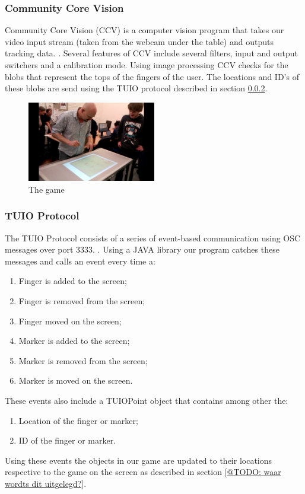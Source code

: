 \documentclass[a4paper,10pt]{report}
\begin{document}
	\subsubsection{Community Core Vision}
	\label{sec:communitycorevision}	
	Community Core Vision (CCV) is a computer vision program that takes our video input stream (taken from the webcam under the table) and outputs tracking data. \cite{ccv}.
			Several features of CCV include several filters, input and output switchers and a calibration mode. 
	Using image processing CCV checks for the blobs that represent the tops of the fingers of the user. 
	The locations and ID's of these blobs are send using the TUIO protocol described in section \ref{sec:tuioprotocol}.
	\begin{figure}[h!]
		\caption{The game}
		\centering
		\includegraphics[width=0.5\textwidth]{images/tafelgebruik}
	\end{figure}
	
	\subsubsection{TUIO Protocol}
	\label{sec:tuioprotocol}
	The TUIO Protocol consists of a series of event-based communication using OSC messages over port 3333. \cite{tuioProtocol}. 
	Using a JAVA library our program catches these messages and calls an event every time a:
	\begin{enumerate}
		\item Finger is added to the screen;
		\item Finger is removed from the screen;
		\item Finger moved on the screen;
		\item Marker is added to the screen;
		\item Marker is removed from the screen;
		\item Marker is moved on the screen.
	\end{enumerate}
	
	These events also include a TUIOPoint object that contains among other the:
	\begin{enumerate}
		\item Location of the finger or marker;
		\item ID of the finger or marker.
	\end{enumerate}
	Using these events the objects in our game are updated to their locations respective to the game on the screen as described in section \ref{@TODO: waar wordts dit uitgelegd?}.
			
\end{document}
